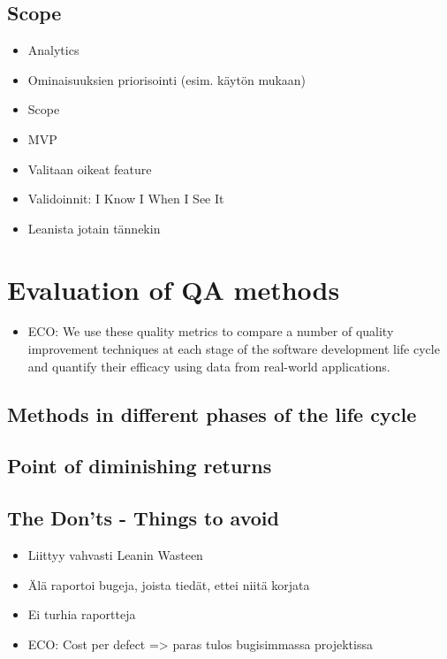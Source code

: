 \documentclass[12pt,a4paper,finnish]{tutthesis}
\begin{document}
 \subsection{Scope}
 
 \begin{itemize}
 
 \item Analytics
 \item Ominaisuuksien priorisointi (esim. käytön mukaan)
 \item Scope
 \item MVP
 \item Valitaan oikeat feature
 \item Validoinnit: I Know I When I See It
 \item Leanista jotain tännekin
 
 \end{itemize}
 
 \section{Evaluation of QA methods}
 
 \begin{itemize}
  
 \item ECO: We use these quality metrics to compare a number of quality improvement techniques at each stage of the software development life cycle and quantify their efficacy using data from real-world applications.
 
 \end{itemize}
 
 \subsection{Methods in different phases of the life cycle}
 
 \subsection{Point of diminishing returns}
 
 \subsection{The Don'ts - Things to avoid}
 
 \begin{itemize}
 
 \item Liittyy vahvasti Leanin Wasteen
 \item Älä raportoi bugeja, joista tiedät, ettei niitä korjata
 \item Ei turhia raportteja
 \item ECO: Cost per defect => paras tulos bugisimmassa projektissa
 
 \end{itemize}
 
\end{document}
